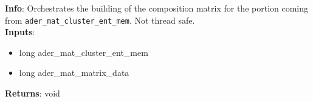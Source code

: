 \textbf{Info}: Orchestrates the building of the composition matrix for the
portion coming from \texttt{ader\_mat\_cluster\_ent\_mem}. Not thread safe. \\

\noindent \textbf{Inputs}:
\begin{itemize}
\item{long ader\_mat\_cluster\_ent\_mem}
\item{long ader\_mat\_matrix\_data}
\end{itemize}

\noindent \textbf{Returns}: void
